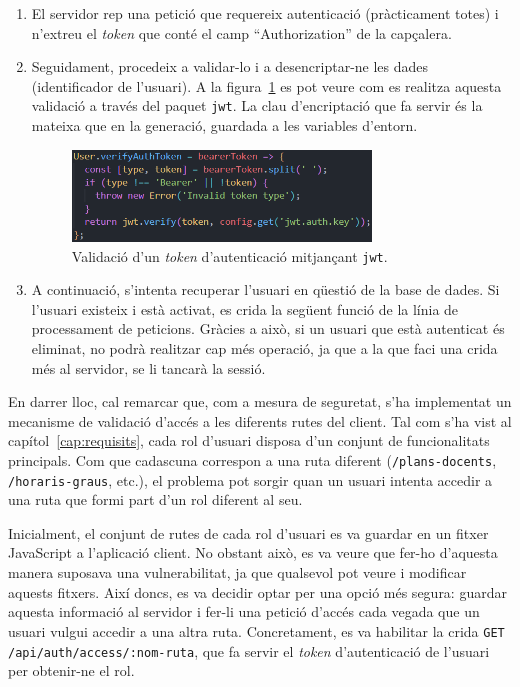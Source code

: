 \documentclass[a4paper,12pt]{ThesisStyle}
\begin{document}
\begin{enumerate}
  \item El servidor rep una petició que requereix autenticació (pràcticament totes) i n'extreu el \textit{token} que conté el camp ``Authorization'' de la capçalera.
  \item Seguidament, procedeix a validar-lo i a desencriptar-ne les dades (identificador de l'usuari). A la figura~\ref{img:validacioToken} es pot veure com es realitza aquesta validació a través del paquet \texttt{jwt}. La clau d'encriptació que fa servir és la mateixa que en la generació, guardada a les variables d'entorn.
  \begin{figure}[H]
    \centering
    \includegraphics[width=0.75\textwidth]{assets/code/seguretat/validacioToken.png}
    \caption{\label{img:validacioToken}Validació d'un \textit{token} d'autenticació mitjançant \texttt{jwt}.}
  \end{figure}
  \item A continuació, s'intenta recuperar l'usuari en qüestió de la base de dades. Si l'usuari existeix i està activat, es crida la següent funció de la línia de processament de peticions. Gràcies a això, si un usuari que està autenticat és eliminat, no podrà realitzar cap més operació, ja que a la que faci una crida més al servidor, se li tancarà la sessió.
\end{enumerate}

En darrer lloc, cal remarcar que, com a mesura de seguretat, s'ha implementat un mecanisme de validació d'accés a les diferents rutes del client. Tal com s'ha vist al capítol~\ref{cap:requisits}, cada rol d'usuari disposa d'un conjunt de funcionalitats principals. Com que cadascuna correspon a una ruta diferent (\texttt{/plans-docents}, \texttt{/horaris-graus}, etc.), el problema pot sorgir quan un usuari intenta accedir a una ruta que formi part d'un rol diferent al seu.

Inicialment, el conjunt de rutes de cada rol d'usuari es va guardar en un fitxer JavaScript a l'aplicació client. No obstant això, es va veure que fer-ho d'aquesta manera suposava una vulnerabilitat, ja que qualsevol pot veure i modificar aquests fitxers. Així doncs, es va decidir optar per una opció més segura: guardar aquesta informació al servidor i fer-li una petició d'accés cada vegada que un usuari vulgui accedir a una altra ruta. Concretament, es va habilitar la crida \texttt{GET /api/auth/access/:nom-ruta}, que fa servir el \textit{token} d'autenticació de l'usuari per obtenir-ne el rol.
\end{document}
